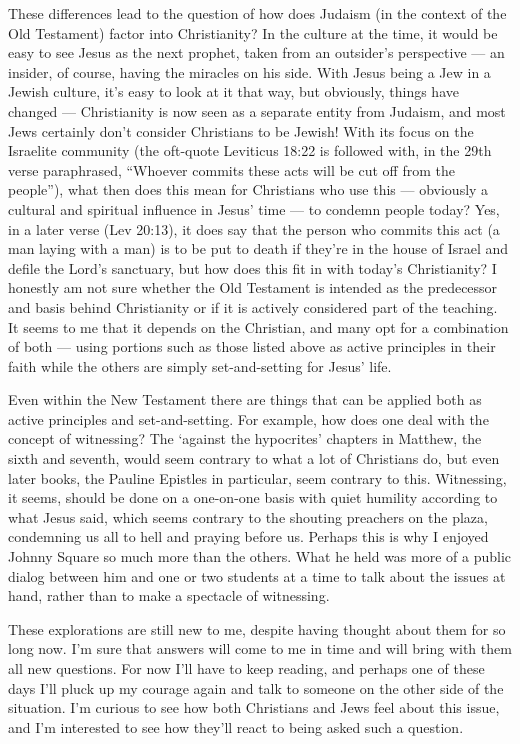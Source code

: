 \documentclass{book}
\begin{document}
These differences lead to the question of how does Judaism (in the context of the Old Testament) factor into Christianity? In the culture at the time, it would be easy to see Jesus as the next prophet, taken from an outsider's perspective --- an insider, of course, having the miracles on his side.  With Jesus being a Jew in a Jewish culture, it's easy to look at it that way, but obviously, things have changed --- Christianity is now seen as a separate entity from Judaism, and most Jews certainly don't consider Christians to be Jewish! With its focus on the Israelite community (the oft-quote Leviticus 18:22 is followed with, in the 29th verse paraphrased, ``Whoever commits these acts will be cut off from the people''), what then does this mean for Christians who use this --- obviously a cultural and spiritual influence in Jesus' time --- to condemn people today? Yes, in a later verse (Lev 20:13), it does say that the person who commits this act (a man laying with a man) is to be put to death if they're in the house of Israel and defile the Lord's sanctuary, but how does this fit in with today's Christianity? I honestly am not sure whether the Old Testament is intended as the predecessor and basis behind Christianity or if it is actively considered part of the teaching.  It seems to me that it depends on the Christian, and many opt for a combination of both --- using portions such as those listed above as active principles in their faith while the others are simply set-and-setting for Jesus' life.

Even within the New Testament there are things that can be applied both as active principles and set-and-setting.  For example, how does one deal with the concept of witnessing? The `against the hypocrites' chapters in Matthew, the sixth and seventh, would seem contrary to what a lot of Christians do, but even later books, the Pauline Epistles in particular, seem contrary to this.  Witnessing, it seems, should be done on a one-on-one basis with quiet humility according to what Jesus said, which seems contrary to the shouting preachers on the plaza, condemning us all to hell and praying before us.  Perhaps this is why I enjoyed Johnny Square so much more than the others.  What he held was more of a public dialog between him and one or two students at a time to talk about the issues at hand, rather than to make a spectacle of witnessing.

These explorations are still new to me, despite having thought about them for so long now.  I'm sure that answers will come to me in time and will bring with them all new questions.  For now I'll have to keep reading, and perhaps one of these days I'll pluck up my courage again and talk to someone on the other side of the situation.  I'm curious to see how both Christians and Jews feel about this issue, and I'm interested to see how they'll react to being asked such a question.
\end{document}
